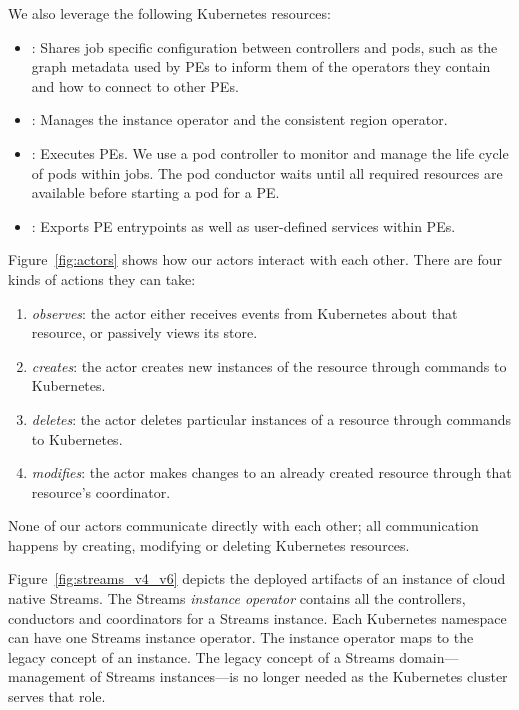 We also leverage the following Kubernetes resources:

\begin{itemize}
    \item {}: Shares job specific configuration between controllers and pods, 
        such as the graph metadata used by PEs to inform them of the operators they contain 
        and how to connect to other PEs. 
    \item {}: Manages the instance operator and the consistent region operator.
    \item {}: Executes PEs. We use a pod controller to monitor and 
        manage the life cycle of pods within jobs. The pod conductor waits until all required
        resources are available before starting a pod for a PE.
    \item {}: Exports PE entrypoints as well as user-defined 
        services within PEs.
\end{itemize}

Figure~\ref{fig:actors} shows how our actors interact with each other. There
are four kinds of actions they can take:

\begin{enumerate}
    \item \emph{observes}: the actor either receives events from Kubernetes about that 
        resource, or passively views its store.
    \item \emph{creates}: the actor creates new instances of the resource through 
        commands to Kubernetes.
    \item \emph{deletes}: the actor deletes particular instances of a resource 
        through commands to Kubernetes.
    \item \emph{modifies}: the actor makes changes to an already created resource 
        through that resource's coordinator.
\end{enumerate}

None of our actors communicate directly with each other; all communication happens 
by creating, modifying or deleting Kubernetes resources.

Figure~\ref{fig:streams_v4_v6} depicts the deployed artifacts of an instance of cloud
native Streams.  The Streams \emph{instance operator} contains all the
controllers, conductors and coordinators for a Streams instance. Each Kubernetes
namespace can have one Streams instance operator. The instance operator maps to
the legacy concept of an instance. The legacy concept of a Streams
domain---management of Streams instances---is no longer needed as the Kubernetes
cluster serves that role.

